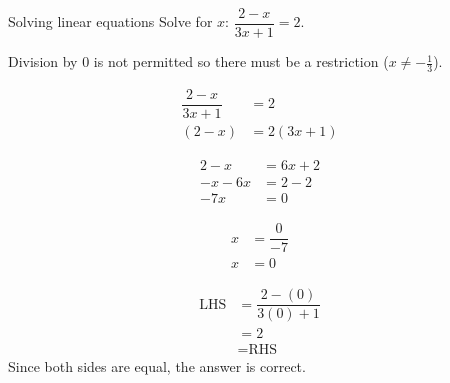 \begin{wex}{Solving linear equations }
{Solve for $x$: $\dfrac{2-x}{3x+1}=2$.} 
{
Division by $0$ is not permitted so there must be a restriction ($x\neq -\frac{1}{3}$).

\begin{align*}
  \dfrac{2-x}{3x+1} &= 2 \\
  (2-x) &= 2(3x+1)
\end{align*}

\begin{align*}
  2-x &= 6x+2 \\
  -x-6x &= 2-2 \\
  -7x &= 0
\end{align*}

\begin{align*}
  x &= \dfrac{0}{-7} \\
  x &= 0
\end{align*}

\begin{align*}
  \mbox{LHS} &=\dfrac{2-(0)}{3(0)+1} \\
	    &= 2 \\
	    &= \mbox{RHS}
\end{align*}
Since both sides are equal, the answer is correct.
}
\end{wex}


